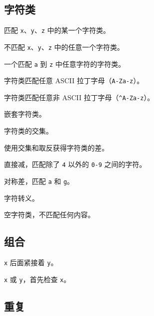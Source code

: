 \documentclass[class=article,openany]{cusdoc}[2025/10/10]
\begin{document}
\subsection{字符类}

\begin{regexsyntax}
  \item[\texttt{[xyz]}] 匹配 \texttt{x}、\texttt{y}、\texttt{z} 中的某一个字符类。
  \item[\texttt{\V^xyz}] 不匹配 \texttt{x}、\texttt{y}、\texttt{z} 中的任意一个字符类。
  \item[\texttt{a-z}] 一个匹配 \texttt{a} 到 \texttt{z} 中任意字符的字符类。
  \item[\texttt{[[:alpha:]]}] 字符类匹配任意 ASCII 拉丁字母（\texttt{A-Za-z}）。
  \item[\texttt{[[:\V^alpha:]]}] 字符类匹配任意非 ASCII 拉丁字母（\texttt{\V^A-Za-z}）。
  \item[\texttt{[x[\V^xyz]]}] 嵌套字符类。
  \item[\texttt{a-y\V{&&}xyz}] 字符类的交集。
  \item[\texttt{0-9\V{&&}[\V^4]}] 使用交集和取反获得字符类的差。
  \item[\texttt{0-9--4}] 直接减，匹配除了 \texttt{4} 以外的 \texttt{0-9} 之间的字符。
  \item[\texttt{a-g\V{~~}b-h}] 对称差，匹配 \texttt{a} 和 \texttt{g}。
  \item[\texttt{[\V{\\[\\]}]}] 字符转义。
  \item[\texttt{[a\V{&&}b]}] 空字符类，不匹配任何内容。
\end{regexsyntax}

\subsection{组合}

\begin{regexsyntax}
  \item[\texttt{xy}] \texttt{x} 后面紧接着 \texttt{y}。
  \item[\texttt{x\V|y}] \texttt{x} 或 \texttt{y}，首先检查 \texttt{x}。
\end{regexsyntax}

\subsection{重复}
\end{document}
